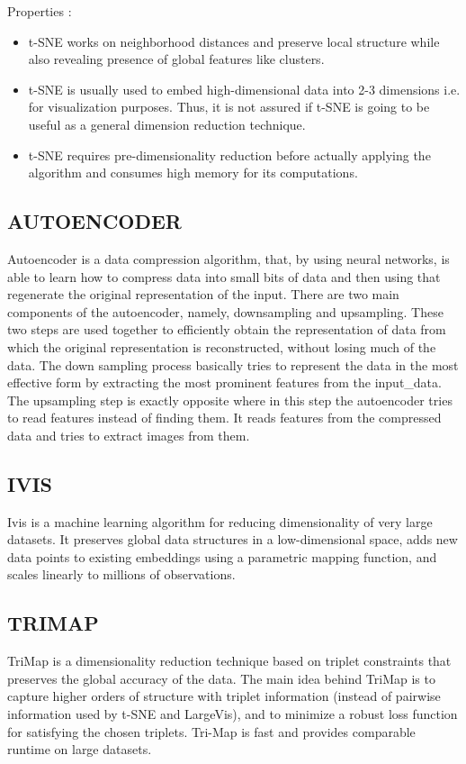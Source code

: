 \documentclass[letterpaper, 10 pt, conference]{ieeeconf}  %
\begin{document}
Properties :
\begin{itemize}
	\item t-SNE works on neighborhood distances and preserve local structure while also revealing presence
of global features like clusters.
	\item t-SNE is usually used to embed high-dimensional data into 2-3 dimensions i.e. for visualization purposes. Thus, it is not assured if t-SNE is going to be useful as a general dimension reduction technique.
	\item t-SNE requires pre-dimensionality reduction before actually applying the algorithm and consumes high memory for its computations.
\end{itemize}

\subsection{AUTOENCODER}
Autoencoder is a data compression algorithm, that, by using neural networks, is able to learn how to compress data into small bits of data and then using that regenerate the original representation of the input. There are two main components of the autoencoder, namely, downsampling and upsampling. These two steps are used together to efficiently obtain the representation of data from which the original representation is reconstructed, without losing much of the data. The down sampling process basically tries to represent the data in the most effective form by extracting the most prominent features from the input\_data. The upsampling step is exactly opposite where in this step the autoencoder tries to read features instead of finding them. It reads features from the compressed data and tries to extract images from them.  

\subsection{IVIS}
Ivis is a machine learning algorithm for reducing dimensionality of very large datasets. It preserves global data structures in a low-dimensional space, adds new data points to existing embeddings using a parametric mapping function, and scales linearly to millions of observations.

\subsection{TRIMAP}
TriMap is a dimensionality reduction technique based on triplet constraints that preserves the global accuracy of the data. The main idea behind TriMap is to capture higher orders of structure with triplet information (instead of pairwise information used by t-SNE and LargeVis), and to minimize a robust loss function for satisfying the chosen triplets. Tri-Map is fast and provides comparable runtime on large datasets.
\end{document}

